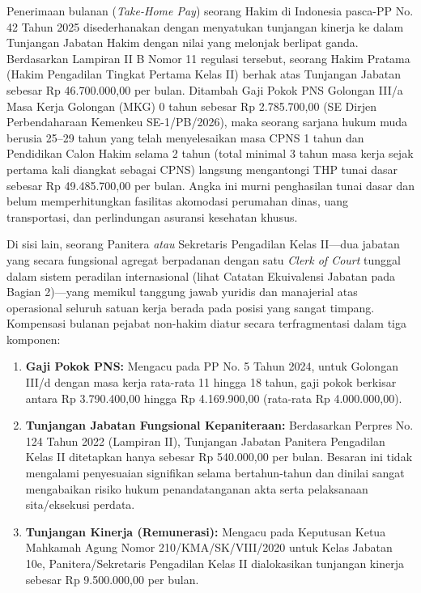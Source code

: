 \documentclass[12pt, a4paper]{article}
\begin{document}
Penerimaan bulanan (\textit{Take-Home Pay}) seorang Hakim di Indonesia pasca-PP No. 42 Tahun 2025 disederhanakan dengan menyatukan tunjangan kinerja ke dalam Tunjangan Jabatan Hakim dengan nilai yang melonjak berlipat ganda. Berdasarkan Lampiran II B Nomor 11 regulasi tersebut, seorang Hakim Pratama (Hakim Pengadilan Tingkat Pertama Kelas II) berhak atas Tunjangan Jabatan sebesar Rp 46.700.000,00 per bulan. Ditambah Gaji Pokok PNS Golongan III/a Masa Kerja Golongan (MKG) 0 tahun sebesar Rp 2.785.700,00 (SE Dirjen Perbendaharaan Kemenkeu SE-1/PB/2026), maka seorang sarjana hukum muda berusia 25--29 tahun yang telah menyelesaikan masa CPNS 1 tahun dan Pendidikan Calon Hakim selama 2 tahun (total minimal 3 tahun masa kerja sejak pertama kali diangkat sebagai CPNS) langsung mengantongi THP tunai dasar sebesar Rp 49.485.700,00 per bulan. Angka ini murni penghasilan tunai dasar dan belum memperhitungkan fasilitas akomodasi perumahan dinas, uang transportasi, dan perlindungan asuransi kesehatan khusus.

Di sisi lain, seorang Panitera \textit{atau} Sekretaris Pengadilan Kelas II---dua jabatan yang secara fungsional agregat berpadanan dengan satu \textit{Clerk of Court} tunggal dalam sistem peradilan internasional (lihat Catatan Ekuivalensi Jabatan pada Bagian 2)---yang memikul tanggung jawab yuridis dan manajerial atas operasional seluruh satuan kerja berada pada posisi yang sangat timpang. Kompensasi bulanan pejabat non-hakim diatur secara terfragmentasi dalam tiga komponen:
\begin{enumerate}
    \item \textbf{Gaji Pokok PNS:} Mengacu pada PP No. 5 Tahun 2024, untuk Golongan III/d dengan masa kerja rata-rata 11 hingga 18 tahun, gaji pokok berkisar antara Rp 3.790.400,00 hingga Rp 4.169.900,00 (rata-rata Rp 4.000.000,00).
    \item \textbf{Tunjangan Jabatan Fungsional Kepaniteraan:} Berdasarkan Perpres No. 124 Tahun 2022 (Lampiran II), Tunjangan Jabatan Panitera Pengadilan Kelas II ditetapkan hanya sebesar Rp 540.000,00 per bulan. Besaran ini tidak mengalami penyesuaian signifikan selama bertahun-tahun dan dinilai sangat mengabaikan risiko hukum penandatanganan akta serta pelaksanaan sita/eksekusi perdata.
    \item \textbf{Tunjangan Kinerja (Remunerasi):} Mengacu pada Keputusan Ketua Mahkamah Agung Nomor 210/KMA/SK/VIII/2020 untuk Kelas Jabatan 10e, Panitera/Sekretaris Pengadilan Kelas II dialokasikan tunjangan kinerja sebesar Rp 9.500.000,00 per bulan.
\end{enumerate}
\end{document}
